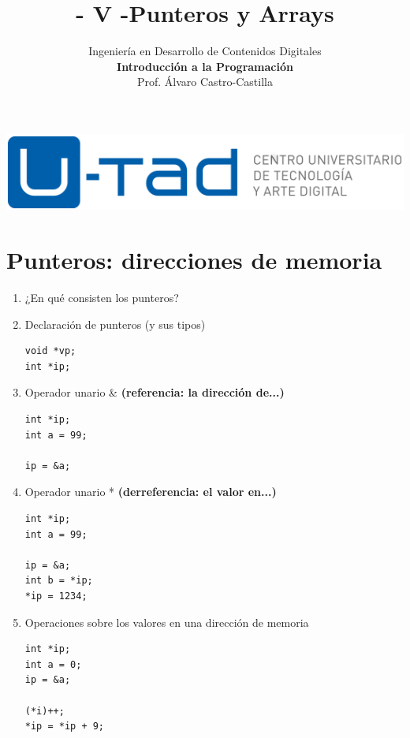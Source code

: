 \documentclass[a4paper,oneside]{article}
\title{- V -\linebreak Punteros y Arrays}
\author{Ingeniería en Desarrollo de Contenidos Digitales\\ \textbf{Introducción a la Programación}\\ Prof. Álvaro Castro-Castilla}
\date{}
\begin{document}
\maketitle

\begin{center}
\includegraphics[scale=0.3,resolution=300]{images/utad.png}
\end{center}


\section{Punteros: direcciones de memoria}
  \begin{enumerate}
  \item ¿En qué consisten los punteros?

  \item Declaración de punteros (y sus tipos)

    \begin{verbatim}
void *vp;
int *ip;
    \end{verbatim}

  \item Operador unario \& \textbf{(referencia: la dirección de...)}

    \begin{verbatim}
int *ip;
int a = 99;

ip = &a;
    \end{verbatim}

  \item Operador unario * \textbf{(derreferencia: el valor en...)}

    \begin{verbatim}
int *ip;
int a = 99;

ip = &a;
int b = *ip;
*ip = 1234;
    \end{verbatim}

  \item Operaciones sobre los valores en una dirección de memoria

    \begin{verbatim}
int *ip;
int a = 0;
ip = &a;

(*i)++;
*ip = *ip + 9;
    \end{verbatim}
  \end{enumerate}
\end{document}
